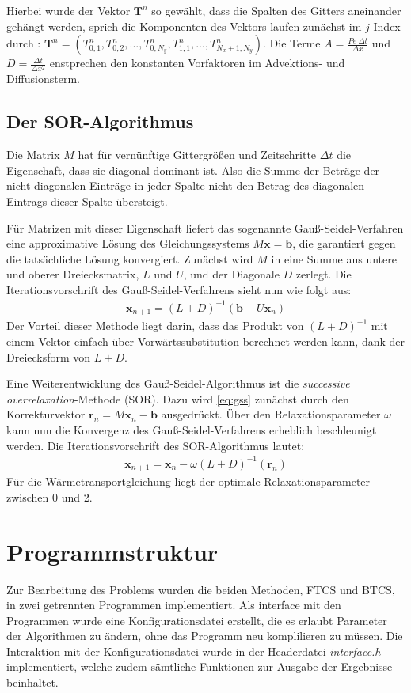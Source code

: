 Hierbei wurde der Vektor $\boldsymbol T^n$ so gewählt, dass die Spalten des Gitters aneinander gehängt werden, sprich die Komponenten des Vektors laufen zunächst im $j$-Index durch : $\boldsymbol T^n = \left( T^n_{0,1}, T^n_{0,2}, ..., T^n_{0,N_y}, T^n_{1,1},...,T^n_{N_x+1,N_y} \right)$.
Die Terme $A=\frac{Pe~\Delta t}{\Delta x}$ und $D=\frac{\Delta t}{\Delta x^2}$ enstprechen den konstanten Vorfaktoren im Advektions- und Diffusionsterm.

\subsection{Der SOR-Algorithmus}
Die Matrix $M$ hat für vernünftige Gittergrößen und Zeitschritte $\Delta t$ die Eigenschaft, dass sie diagonal dominant ist. Also die Summe der Beträge der nicht-diagonalen Einträge in jeder Spalte nicht den Betrag des diagonalen Eintrags dieser Spalte übersteigt.

Für Matrizen mit dieser Eigenschaft liefert das sogenannte Gauß-Seidel-Verfahren eine approximative Lösung des Gleichungssystems $ M\boldsymbol x = \boldsymbol b$, die garantiert gegen die tatsächliche Lösung konvergiert.
Zunächst wird $M$ in eine Summe aus untere und oberer Dreiecksmatrix, $L$ und $U$, und der Diagonale $D$ zerlegt. Die Iterationsvorschrift des Gauß-Seidel-Verfahrens sieht nun wie folgt aus:
\begin{align}
  \boldsymbol x_{n+1} = (L+D)^{-1}(\boldsymbol b - U\boldsymbol x_{n}) \label{eq:gss}
\end{align}
Der Vorteil dieser Methode liegt darin, dass das Produkt von $(L+D)^{-1}$ mit einem Vektor einfach über Vorwärtssubstitution berechnet werden kann, dank der Dreiecksform von $L+D$.

Eine Weiterentwicklung des Gauß-Seidel-Algorithmus ist die \emph{successive overrelaxation}-Methode (SOR). Dazu wird \cref{eq:gss} zunächst durch den Korrekturvektor $\boldsymbol r_n = M\boldsymbol x_n -\boldsymbol b$ ausgedrückt.
Über den Relaxationsparameter $\omega$ kann nun die Konvergenz des Gauß-Seidel-Verfahrens erheblich beschleunigt werden.
Die Iterationsvorschrift des SOR-Algorithmus lautet:
\begin{align}
  \boldsymbol x_{n+1} = \boldsymbol x_n - \omega (L+D)^{-1}(\boldsymbol r_n) \label{eq:sor}
\end{align}
Für die Wärmetransportgleichung liegt der optimale Relaxationsparameter zwischen 0 und 2.


\section{Programmstruktur}
Zur Bearbeitung des Problems wurden die beiden Methoden, FTCS und BTCS, in zwei getrennten Programmen implementiert. Als interface mit den Programmen wurde eine Konfigurationsdatei erstellt, die es erlaubt Parameter der Algorithmen zu ändern, ohne das Programm neu komplilieren zu müssen.
Die Interaktion mit der Konfigurationsdatei wurde in der Headerdatei \emph{interface.h} implementiert, welche zudem sämtliche Funktionen zur Ausgabe der Ergebnisse beinhaltet.

